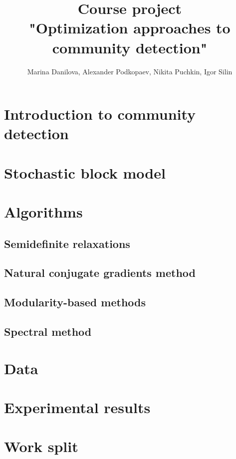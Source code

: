 \documentclass[11pt,a4paper]{extarticle}
\title{Course project \\
"Optimization approaches to community detection"}
\author{ Marina Danilova, Alexander Podkopaev, Nikita Puchkin, Igor Silin }
\begin{document}
\maketitle

\section{Introduction to community detection}

\section{Stochastic block model}

\section{Algorithms}
	
	\subsection{Semidefinite relaxations}
	\subsection{Natural conjugate gradients method}
		
	\subsection{Modularity-based methods}
	\subsection{Spectral method}

\section{Data}

\section{Experimental results}

\section{Work split}
\end{document}
